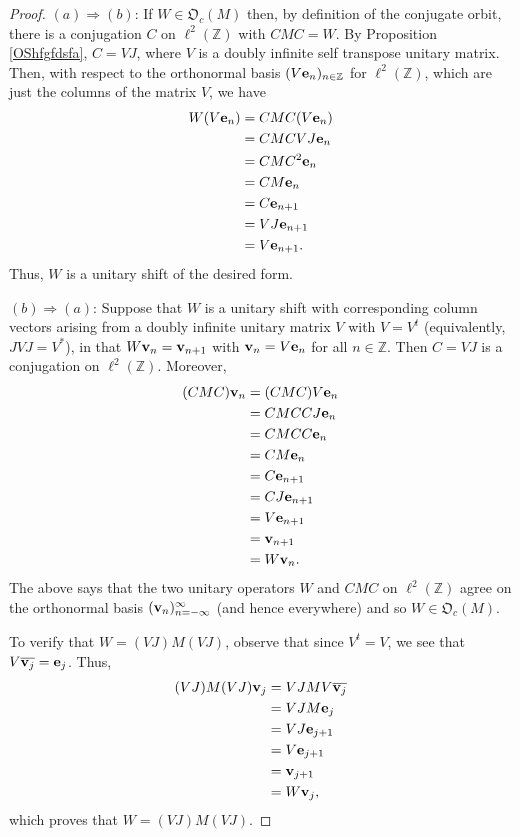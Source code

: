 \documentclass[10pt,a4paper]{amsart}
\def\Z{\mathbb{Z}}
\renewcommand{\vec}[1]{{\bf #1}}
\begin{document}
\begin{proof}
$(a) \Longrightarrow (b)$: If $W \in \mathfrak{O}_c(M)$ then, by definition of the conjugate orbit, there is a conjugation $C$ on $\ell^2(\Z)$ with $C M C = W$. By Proposition \ref{OShfgfdsfa}, $C = V J$, where  $V$ is a doubly infinite self transpose unitary matrix. Then, with respect to the orthonormal basis  $(V \vec{e}_{n})_{n \in \Z}$ for $\ell^2(\Z)$, which are just the columns of the matrix  $V$, we have
\begin{align*}
W (V \vec{e}_n) & = 
C M C (V \vec{e}_n)\\
 & = C M C V J \vec{e}_n\\
& = C M C^2 \vec{e}_n \\
&= C M \vec{e}_n \\
&= C \vec{e}_{n + 1} \\
& = V J \vec{e}_{n + 1} \\
& = V \vec{e}_{n + 1}.
\end{align*}
Thus, $W$ is a unitary shift of the desired form.

$(b) \Longrightarrow (a)$: 
Suppose that $W$ is a unitary shift with corresponding column vectors arising from a doubly infinite unitary matrix  $V$ with $V = V^{t}$ (equivalently, $J V J = V^{*}$),  in that $W \vec{v}_n = \vec{v}_{n + 1}$ with $\vec{v}_{n} = V \vec{e}_n$ for all $n \in \Z$.  Then $C = V J$ is a conjugation on $\ell^2(\Z)$. 
Moreover,
\begin{align*}
(CMC) \vec{v}_n & = (C M C) V \vec{e}_n\\
& = C M C C J \vec{e}_n\\
&= C M C C \vec{e}_{n}\\
& = C M \vec{e}_{n}\\
& = C \vec{e}_{n + 1}\\
& = C J \vec{e}_{n + 1}\\
& = V \vec{e}_{n + 1}\\
& = \vec{v}_{n + 1}\\
& = W \vec{v}_n.
\end{align*}
The above says that the two unitary operators $W$ and $CMC$ on $\ell^2(\Z)$ agree on the orthonormal basis $(\vec{v}_n)_{n = -\infty}^{\infty}$ (and hence everywhere) and so $W \in \mathfrak{O}_c(M)$. 

To verify that $W = (VJ) M (VJ)$, observe that since $V^{t} = V$, we see that $V \overline{\vec{v}_j} = \vec{e}_j$. Thus, 
\begin{align*}
(VJ) M (VJ) \vec{v}_j & = VJ M V \overline{\vec{v}_j}\\
& = VJ M \vec{e}_j\\
& = VJ \vec{e}_{j + 1}\\
& = V \vec{e}_{j + 1}\\
& = \vec{v}_{j + 1}\\
& = W \vec{v}_{j},
\end{align*}
which proves that $W = (V J) M (VJ)$.
\end{proof}
\end{document}
